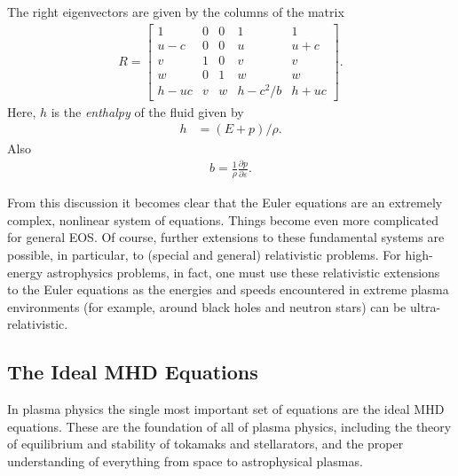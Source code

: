 \documentclass[12pt]{article}
\theoremstyle{definition}
\theoremstyle{definition}
\theoremstyle{definition}
\begin{document}
The right eigenvectors are given by the columns of the matrix
\begin{align}
  R
  =
  \left[
    \begin{matrix}
      1 & 0 & 0 & 1 & 1 \\
      u-c & 0 & 0 & u & u+c \\
      v & 1 & 0 & v & v \\
      w & 0 & 1 & w & w \\
      h-uc & v & w & h-c^2/b & h+uc
    \end{matrix}
  \right].
  \label{eq:euler-rev}
\end{align}
Here, $h$ is the \emph{enthalpy} of the fluid given by
\begin{align}
  h &= (E+p)/\rho.
\end{align}
Also
\begin{align}
  b = \frac{1}{\rho}\frac{\partial p}{\partial \varepsilon}.
\end{align}

From this discussion it becomes clear that the Euler equations are an
extremely complex, nonlinear system of equations. Things become even
more complicated for general EOS. Of course, further extensions to
these fundamental systems are possible, in particular, to (special and
general) relativistic problems. For high-energy astrophysics problems,
in fact, one must use these relativistic extensions to the Euler
equations as the energies and speeds encountered in extreme plasma
environments (for example, around black holes and neutron stars) can
be ultra-relativistic.

\subsection{The Ideal MHD Equations}

In plasma physics the single most important set of equations are the
ideal MHD equations. These are the foundation of all of plasma
physics, including the theory of equilibrium and stability of tokamaks
and stellarators, and the proper understanding of everything from
space to astrophysical plasmas.
\end{document}
